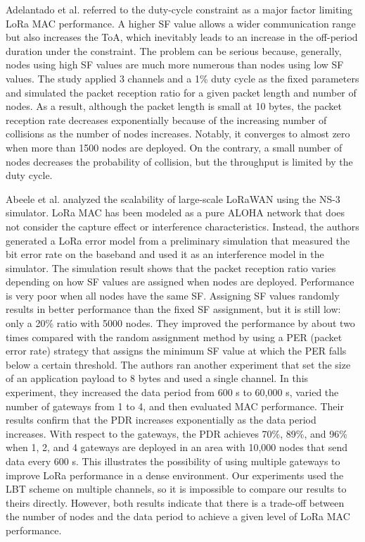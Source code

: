 Adelantado et al.
\cite{adelantado_understanding_2017} referred to the duty-cycle constraint as a major factor limiting LoRa MAC performance.
A higher SF value allows a wider communication range but also increases the ToA,
	which inevitably leads to an increase in the off-period duration under the constraint.
The problem can be serious because,
	generally,
	nodes using high SF values are much more numerous than nodes using low SF values.
The study applied 3 channels and a 1\% duty cycle as the fixed parameters and simulated
the packet reception ratio for a given packet length and number of nodes.
As a result,
	although the packet length is small at 10 bytes,
	the packet reception rate decreases exponentially because of the increasing number of collisions as the number of nodes increases.
Notably,
	it converges to almost zero when more than 1500 nodes are deployed.
On the contrary,
	a small number of nodes decreases the probability of collision,
	but the throughput is limited by the duty cycle.

Abeele et al.
\cite{abeele_scalability_2017} analyzed the scalability of large-scale LoRaWAN using the NS-3 simulator.
LoRa MAC has been modeled as a pure ALOHA network that does not consider the capture effect or interference characteristics.
Instead,
	the authors generated a LoRa error model from a preliminary simulation that measured the bit error rate on the baseband and used it as an interference model in the simulator.
The simulation result shows that the packet reception ratio varies depending on how SF values are assigned when nodes are deployed.
Performance is very poor when all nodes have the same SF.
Assigning SF values randomly results in better performance than the fixed SF assignment,
	but it is still low:
	only a 20\% ratio with 5000 nodes.
They improved the performance by about two times compared with the random assignment method by using a PER (packet error rate) strategy that assigns the minimum SF value at which the PER falls below a certain threshold.
The authors ran another experiment that set the size of an application payload to 8 bytes and used a single channel.
In this experiment,
	they increased the data period from 600 s to 60,000 s,
	varied the number of gateways from 1 to 4,
	and then evaluated MAC performance.
Their results confirm that the PDR increases exponentially as the data period increases.
With respect to the gateways,
	the PDR achieves 70\%, 89\%,
and 96\% when 1, 2,
and 4 gateways are deployed in an area with 10,000 nodes that send data every 600 s.
This illustrates the possibility of using multiple gateways to improve LoRa performance in a dense environment.
Our experiments used the LBT scheme on multiple channels,
	so it is impossible to compare our results to theirs directly.
However,
	both results indicate that there is a trade-off between the number of nodes and the data period to achieve a given level of LoRa MAC performance.

